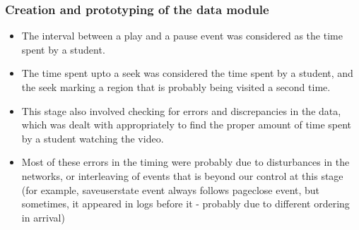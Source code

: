 \documentclass[12pt,xcolor=dvipsnames]{beamer}
\begin{document}
\begin{frame}[t]
\frametitle{Creation and prototyping of the data module}

\begin{itemize}

\item The interval between a play and a pause event was considered as the time spent by a student.

\item The time spent upto a seek was considered the time spent by a student, and the seek marking a region that is probably being visited a second time.

\item This stage also involved checking for errors and discrepancies in the data, which was dealt with appropriately to find the proper amount of time spent by a student watching the video.

\item Most of these errors in the timing were probably due to disturbances in the networks, or interleaving of events that is beyond our control at this stage (for example, saveuserstate event always follows pageclose event, but sometimes, it appeared in logs before it - probably due to different ordering in arrival)


\end{itemize}

\end{frame}
\end{document}
